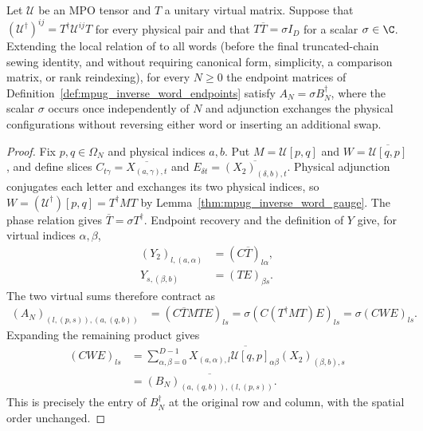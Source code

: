 \begin{lemma}
    \label{thm:mpug_inverse_word_adjoint}
    \leanok
    Let $\mathcal U$ be an MPO tensor and $T$ a unitary virtual matrix.
    Suppose that $(\mathcal U^\dagger)^{ij}=T^\dagger\mathcal U^{ij}T$
    for every physical pair and that $T\overline T=\sigma I_D$ for a
    scalar $\sigma\in\C$. Extending the local relation of
    \cite[lines~5444--5487]{FrancoRubio2025MPUGauging} to all words (before the
    final truncated-chain sewing identity, and without requiring canonical
    form, simplicity, a comparison matrix, or rank reindexing), for every
    $N\geq0$ the endpoint matrices of
    Definition~\ref{def:mpug_inverse_word_endpoints} satisfy
    $A_N=\sigma B_N^\dagger$, where the scalar $\sigma$ occurs once
    independently of $N$ and adjunction exchanges the physical configurations
    without reversing either word or inserting an additional swap.
\end{lemma}
\begin{proof}\leanok
    Fix $p,q\in\Omega_N$ and physical indices $a,b$. Put
    $M=\mathcal U[p,q]$ and $W=\overline{\mathcal U[q,p]}$, and define
    slices $C_{t\gamma}=\overline{X_{(a,\gamma),t}}$ and
    $E_{\delta t}=\overline{(X_2)_{(\delta,b),t}}$.
    Physical adjunction conjugates each letter and exchanges its two
    physical indices, so
    $W=(\mathcal U^\dagger)[p,q]=T^\dagger MT$ by
    Lemma~\ref{thm:mpug_inverse_word_gauge}. The phase relation gives
    $\overline T=\sigma T^\dagger$. Endpoint recovery and the definition
    of $Y$ give, for virtual indices $\alpha,\beta$,
    \begin{align}
        (Y_2)_{l,(a,\alpha)} & =(C\overline T)_{l\alpha}, \\
        Y_{s,(\beta,b)}      & =(TE)_{\beta s}.
    \end{align}
    The two virtual sums therefore contract as
    \begin{align}
        (A_N)_{(l,(p,s)),(a,(q,b))}
         & =(C\overline T MTE)_{ls}
        =\sigma(C(T^\dagger MT)E)_{ls}
        =\sigma(CWE)_{ls}.
    \end{align}
    Expanding the remaining product gives
    \begin{align}
        (CWE)_{ls}
         & =\overline{\sum_{\alpha,\beta=0}^{D-1}
        X_{(a,\alpha),l}\mathcal U[q,p]_{\alpha\beta}(X_2)_{(\beta,b),s}} \\
         & =\overline{(B_N)_{(a,(q,b)),(l,(p,s))}}.
    \end{align}
    This is precisely the entry of $B_N^\dagger$ at the original row
    and column, with the spatial order unchanged.
\end{proof}
